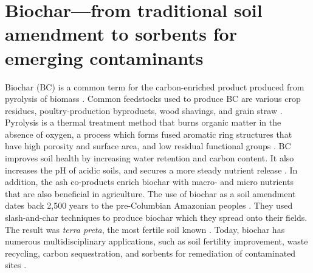 
\section{Biochar---from traditional soil amendment to sorbents for emerging contaminants}
Biochar (BC) is a common term for the carbon-enriched product produced from pyrolysis of biomass \citep{LehmannAndJoseph2015}. Common feedstocks used to produce BC are various crop residues, poultry-production byproducts, wood shavings, and grain straw \citep{Ahmad2014}. Pyrolysis is a thermal treatment method that burns organic matter in the absence of oxygen, a process which forms fused aromatic ring structures that have high porosity and surface area, and low residual functional groups \citep{LehmannAndJoseph2015}. BC improves soil health by increasing water retention and carbon content. It also increases the pH of acidic soils, and secures a more steady nutrient release \citep{das2020application}. In addition, the ash co-products enrich biochar with macro- and micro nutrients that are also beneficial in agriculture. The use of biochar as a soil amendment dates back 2,500 years to the pre-Columbian Amazonian peoples \citep{Tindall2017}. They used slash-and-char techniques to produce biochar which they spread onto their fields. The result was \textit{terra preta}, the most fertile soil known \citep{Ahmad2014}. Today, biochar has numerous multidisciplinary applications, such as soil fertility improvement, waste recycling, carbon sequestration, and sorbents for remediation of contaminated sites \citep{beesley2011review}.


